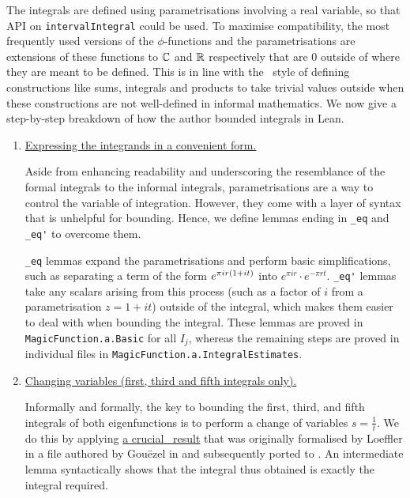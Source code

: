 The integrals are defined using parametrisations involving a real variable, so that API on \lstinline|intervalIntegral| could be used. To maximise compatibility, the most frequently used versions of the $\phi$-functions and the parametrisations are extensions of these functions to $\mathbb{C}$ and $\mathbb{R}$ respectively that are $0$ outside of where they are meant to be defined. This is in line with the \mathlib\ style of defining constructions like sums, integrals and products to take trivial values outside when these constructions are not well-defined in informal mathematics. We now give a step-by-step breakdown of how the author bounded integrals in Lean.

\begin{enumerate}
    \item \underline{Expressing the integrands in a convenient form.}

    Aside from enhancing readability and underscoring the resemblance of the formal integrals to the informal integrals, parametrisations are a way to control the variable of integration. However, they come with a layer of syntax that is unhelpful for bounding. Hence, we define lemmas ending in \lstinline|_eq| and \lstinline|_eq'| to overcome them.
    
    \lstinline|_eq| lemmas expand the parametrisations and perform basic simplifications, such as separating a term of the form $e^{\pi i r\left( 1 + it \right)}$ into $e^{\pi i r} \cdot e^{-\pi r t}$. \lstinline|_eq'| lemmas take any scalars arising from this process (such as a factor of $i$ from a parametrisation $z = 1 + it$) outside of the integral, which makes them easier to deal with when bounding the integral. These lemmas are proved in \lstinline|MagicFunction.a.Basic| for all $I_j$, whereas the remaining steps are proved in individual files in \lstinline|MagicFunction.a.IntegralEstimates|.

    \item \underline{Changing variables (first, third and fifth integrals only).}

    Informally and formally, the key to bounding the first, third, and fifth integrals of both eigenfunctions is to perform a change of variables $s = \frac{1}{t}$. We do this by applying \href{https://github.com/leanprover-community/mathlib4/blob/5a2eaa85c555c4263e15928cef249cbaad2eb2d2/Mathlib/MeasureTheory/Function/Jacobian.lean#L1199}{a crucial \mathlib\ result} that was originally formalised by Loeffler in a file authored by Gouëzel in  and subsequently ported to . An intermediate lemma syntactically shows that the integral thus obtained is exactly the integral required.


\end{enumerate}
